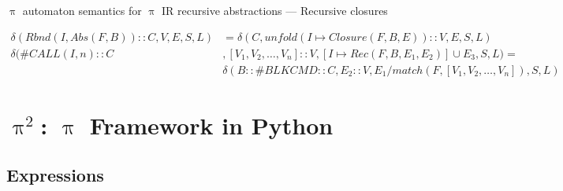 \documentclass{beamer}
\begin{document}

\begin{frame}{{\color{red}$\uppi$ automaton} semantics for {\color{red}$\uppi$ IR} recursive abstractions --- Recursive closures}

\begin{tiny}
\begin{align}
\delta(\mathit{Rbnd}(I, Abs(F, B)) :: C, V, E, S, L) & = \delta(C, \mathit{unfold}(I \mapsto \mathit{Closure}(F, B, E)) :: V, E, S, L) \\ 
\delta(\#\mathit{CALL}(I, n) ::C & , [V_1, V_2, \ldots, V_n] :: V, [I \mapsto \mathit{Rec}(F, B, E_1, E_2)] \cup E_3, S, L) = \\ \nonumber
	& \delta(B :: \#\mathit{BLKCMD} :: C, E_2 :: V, E_1 / \mathit{match}(F,  [V_1, V_2, \ldots, V_n]), S, L) 
\end{align}
\end{tiny}

\end{frame}

\section{$\uppi^2$: $\uppi$ Framework in Python}

\subsection{Expressions}
\end{document}
